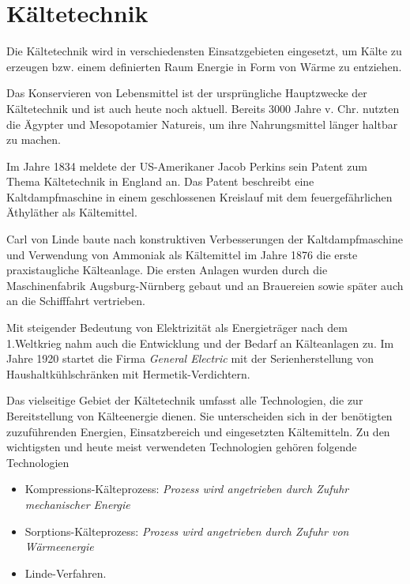 
\section{Kältetechnik}
\label{sec:Kaeltetechnik}

Die Kältetechnik wird in verschiedensten Einsatzgebieten eingesetzt, um Kälte zu erzeugen bzw. einem definierten Raum Energie in Form von Wärme zu entziehen. 

Das Konservieren von Lebensmittel ist  der ursprüngliche Hauptzwecke der Kältetechnik und ist auch heute noch aktuell. Bereits 3000 Jahre v. Chr. nutzten die Ägypter und Mesopotamier Natureis, um ihre Nahrungsmittel länger haltbar zu machen.\citep{Danfoss2006}

Im Jahre 1834 meldete der US-Amerikaner Jacob Perkins sein Patent zum Thema Kältetechnik in England an. Das Patent beschreibt eine Kaltdampfmaschine in einem geschlossenen Kreislauf mit dem feuergefährlichen Äthyläther als Kältemittel.\citep{Siemens2007}

Carl von Linde baute nach konstruktiven Verbesserungen der Kaltdampfmaschine und Verwendung von Ammoniak als Kältemittel im Jahre 1876 die erste praxistaugliche Kälteanlage. Die ersten Anlagen wurden durch die Maschinenfabrik Augsburg-Nürnberg gebaut und an Brauereien sowie später auch an die Schifffahrt vertrieben.

Mit steigender Bedeutung von Elektrizität als Energieträger nach dem 1.Weltkrieg nahm auch die Entwicklung und der Bedarf an Kälteanlagen zu. Im Jahre 1920 startet die Firma \textit{General Electric} mit der Serienherstellung von Haushaltkühlschränken mit Hermetik-Verdichtern.

Das vielseitige Gebiet der Kältetechnik umfasst alle Technologien, die zur Bereitstellung von Kälteenergie dienen. Sie unterscheiden sich in der benötigten zuzuführenden Energien, Einsatzbereich und eingesetzten Kältemitteln.  Zu den wichtigsten und heute meist verwendeten Technologien gehören folgende Technologien

\begin{itemize}

\item Kompressions-Kälteprozess: \textit{Prozess wird angetrieben durch Zufuhr mechanischer Energie}
\item Sorptions-Kälteprozess: \textit{Prozess wird angetrieben durch Zufuhr von Wärmeenergie}
\item Linde-Verfahren.

\end{itemize}

